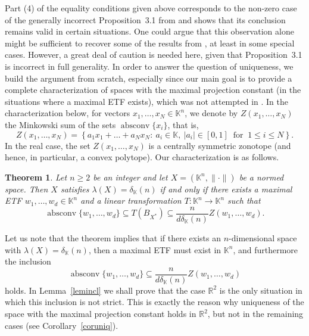 \documentclass[12pt, reqno]{amsart}
\newtheorem{twr}{Theorem}[section]
\theoremstyle{definition}
\theoremstyle{remark}
\numberwithin{equation}{section}
\DeclareMathOperator{\absconv}{absconv}
\begin{document}
Part (4) of the equality conditions given above corresponds to the non-zero case of the generally incorrect Proposition~3.1 from \cite{konigtomczak} and shows that its conclusion remains valid in certain situations. One could argue that this observation alone might be sufficient to recover some of the results from \cite{konigtomczak2}, at least in some special cases. However, a great deal of caution is needed here, given that Proposition~3.1 is incorrect in full generality. In order to answer the question of uniqueness, we build the argument from scratch, especially since our main goal is to provide a complete characterization of spaces with the maximal projection constant (in the situations where a maximal ETF exists), which was not attempted in \cite{konigtomczak2}. In the characterization below, for vectors $x_1,\ldots,x_N\in\mathbb K^n$, we denote by $Z(x_1,\ldots,x_N)$ the Minkowski sum of the sets $\absconv\{x_i\}$, that is,
$$Z(x_1, \ldots, x_N) = \left \{a_1x_1 + \ldots + a_Nx_N: \ a_i \in \mathbb{K}, \ |a_i| \in [0, 1] \ \text{ for } \ 1 \leq i \leq N \right \}.$$
In the real case, the set $Z(x_1,\ldots,x_N)$ is a centrally symmetric zonotope (and hence, in particular, a convex polytope). Our characterization is as follows.
\begin{twr}
\label{twrchar}
Let $n \geq 2$ be an integer and let $X = (\mathbb{K}^n, \| \cdot \|)$ be a normed space. Then $X$ satisfies $\lambda(X) = \delta_{\mathbb{K}}(n)$ if and only if there exists a maximal ETF $w_1, \ldots, w_d \in \mathbb{K}^n$ and a linear transformation $T: \mathbb{K}^n \to \mathbb{K}^n$ such that
$$\absconv \{w_1, \ldots, w_d\} \subseteq T(B_{X^*}) \subseteq \frac{n}{d\delta_{\mathbb{K}}(n)} Z(w_1, \ldots, w_d).$$
\end{twr}

Let us note that the theorem implies that if there exists an $n$-dimensional space with $\lambda(X) = \delta_{\mathbb{K}}(n)$, then a maximal ETF must exist in $\mathbb{K}^n$, and furthermore the inclusion 
\begin{equation}
\label{inclusion}
\absconv \{w_1, \ldots, w_d\} \subseteq \frac{n}{d\delta_{\mathbb{K}}(n)} Z(w_1, \ldots, w_d)
\end{equation}
holds. In Lemma~\ref{lemincl} we shall prove that the case $\mathbb R^2$ is the only situation in which this inclusion is not strict. This is exactly the reason why uniqueness of the space with the maximal projection constant holds in $\mathbb R^2$, but not in the remaining cases (see Corollary~\ref{coruniq}).
\end{document}
